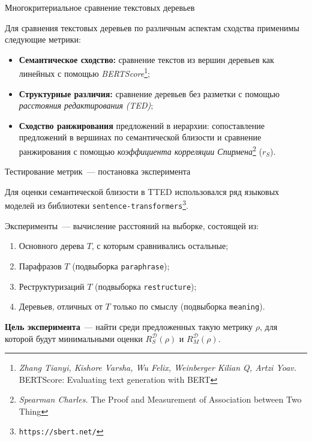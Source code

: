 \documentclass{beamer}
\begin{document}

\begin{frame}{Многокритериальное сравнение текстовых деревьев}

Для сравнения текстовых деревьев по различным аспектам сходства применимы следующие метрики:
\begin{itemize}
    \item \textbf{Семантическое сходство:} сравнение текстов из вершин деревьев как линейных с помощью \textit{BERTScore}\footnote{\textit{Zhang Tianyi, Kishore Varsha, Wu Felix, Weinberger Kilian Q, Artzi Yoav.} BERTScore: Evaluating text generation with BERT};
    \item \textbf{Структурные различия:} сравнение деревьев без разметки с помощью \textit{расстояния редактирования} \textit{(TED)};
    \item \textbf{Сходство ранжирования} предложений в иерархии: сопоставление предложений в вершинах по семантической близости и сравнение ранжирования с помощью \textit{коэффициента корреляции Спирмена}\footnote{\textit{Spearman Charles.} The Proof and Measurement of Association between Two Thing} ($r_S$).
\end{itemize}
    
\end{frame}


\begin{frame}{Тестирование метрик~--- постановка эксперимента}

Для оценки семантической близости в TTED использовался ряд языковых моделей из библиотеки \texttt{sentence-transformers}\footnote{\texttt{https://sbert.net/}}. 

Эксперименты~--- вычисление расстояний на выборке, состоящей из:
\begin{enumerate}
    \item Основного дерева $T$, с которым сравнивались остальные;
    \item Парафразов $T$ (подвыборка \texttt{paraphrase});
    \item Реструктуризаций $T$ (подвыборка \texttt{restructure});
    \item Деревьев, отличных от $T$ только по смыслу (подвыборка \texttt{meaning}).
\end{enumerate}
\textbf{Цель эксперимента}~--- найти среди предложенных такую метрику $\rho$, для которой будут минимальными оценки $R_S^\mathcal{D}(\rho)$ и $R_M^\mathcal{D}(\rho)$.

\end{frame}
\end{document}
